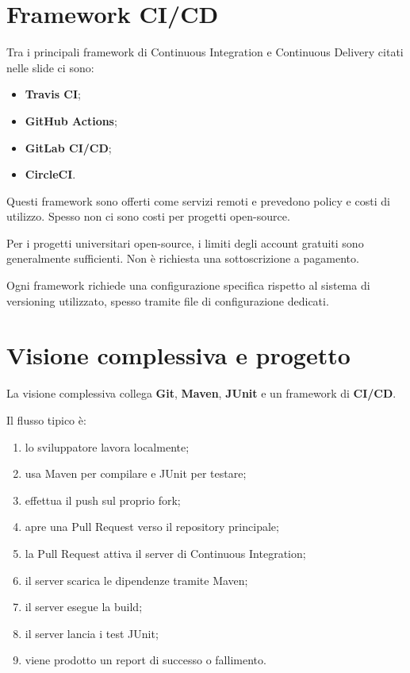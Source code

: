 \section{Framework CI/CD}

Tra i principali framework di Continuous Integration e Continuous Delivery citati nelle slide ci sono:

\begin{itemize}
    \item \textbf{Travis CI};
    \item \textbf{GitHub Actions};
    \item \textbf{GitLab CI/CD};
    \item \textbf{CircleCI}.
\end{itemize}

\begin{notaslide}
Questi framework sono offerti come servizi remoti e prevedono policy e costi di utilizzo. Spesso non ci sono costi per progetti open-source.
\end{notaslide}

\begin{notaesame}
Per i progetti universitari open-source, i limiti degli account gratuiti sono generalmente sufficienti. Non è richiesta una sottoscrizione a pagamento.
\end{notaesame}

Ogni framework richiede una configurazione specifica rispetto al sistema di versioning utilizzato, spesso tramite file di configurazione dedicati.

\section{Visione complessiva e progetto}

La visione complessiva collega \textbf{Git}, \textbf{Maven}, \textbf{JUnit} e un framework di \textbf{CI/CD}.

Il flusso tipico è:

\begin{enumerate}
    \item lo sviluppatore lavora localmente;
    \item usa Maven per compilare e JUnit per testare;
    \item effettua il push sul proprio fork;
    \item apre una Pull Request verso il repository principale;
    \item la Pull Request attiva il server di Continuous Integration;
    \item il server scarica le dipendenze tramite Maven;
    \item il server esegue la build;
    \item il server lancia i test JUnit;
    \item viene prodotto un report di successo o fallimento.
\end{enumerate}

